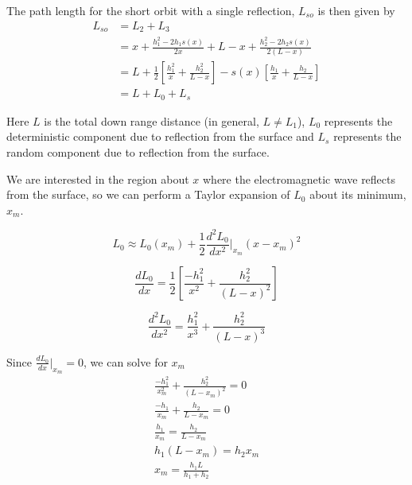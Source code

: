 The path length for the short orbit with a single reflection, $L_{so}$ is then given by
\begin{equation}
\begin{aligned}
L_{so} &= L_2 + L_3 \\
& = x + \frac{h_1^2-2h_1s(x)}{2x} +  L-x + \frac{h_2^2 - 2h_2s(x)}{2\left(L-x\right)} \\
& = L + \frac{1}{2}\left[\frac{h_1^2}{x} + \frac{h_2^2}{L-x} \right] - s(x)\left[ \frac{h_1}{x} + \frac{h_2}{L-x}\right] \\
&= L + L_0 + L_s
\end{aligned}
\label{mp_eq:2}
\end{equation}
\renewcommand{\baselinestretch}{2} \small\normalsize

Here $L$ is the total down range distance (in general, $L \neq L_1$), $L_0$ represents the deterministic component due to reflection from the surface and $L_s$ represents the random component due to reflection from the surface.

We are interested in the region about $x$ where the electromagnetic wave reflects from the surface, so we can perform a Taylor expansion of $L_0$ about its minimum, $x_m$.

\begin{equation}
L_0 \approx L_0(x_m) + \frac{1}{2}\frac{d^2L_0}{dx^2}\bigg|_{x_m}(x-x_m)^2
\label{mp_eq:3}
\end{equation}

\begin{equation}
\frac{dL_0}{dx} = \frac{1}{2}\left[\frac{-h_1^2}{x^2} + \frac{h_2^2}{(L-x)^2} \right]
\label{mp_eq:3}
\end{equation}

\begin{equation}
\frac{d^2L_0}{dx^2} = \frac{h_1^2}{x^3} + \frac{h_2^2}{(L-x)^3} 
\label{mp_eq:3}
\end{equation}

Since $\frac{dL_0}{dx}\big|_{x_m} = 0$, we can solve for $x_m$
\begin{equation}
\begin{gathered}
\frac{-h_1^2}{x_m^2} + \frac{h_2^2}{(L-x_m)^2} = 0\\
\frac{-h_1}{x_m} + \frac{h_2}{L-x_m} = 0\\
\frac{h_1}{x_m} = \frac{h_2}{L-x_m}\\
h_1(L-x_m) = h_2x_m\\
x_m = \frac{h_1L}{h_1+h_2}
\end{gathered}
\label{mp_eq:5}
\end{equation}

